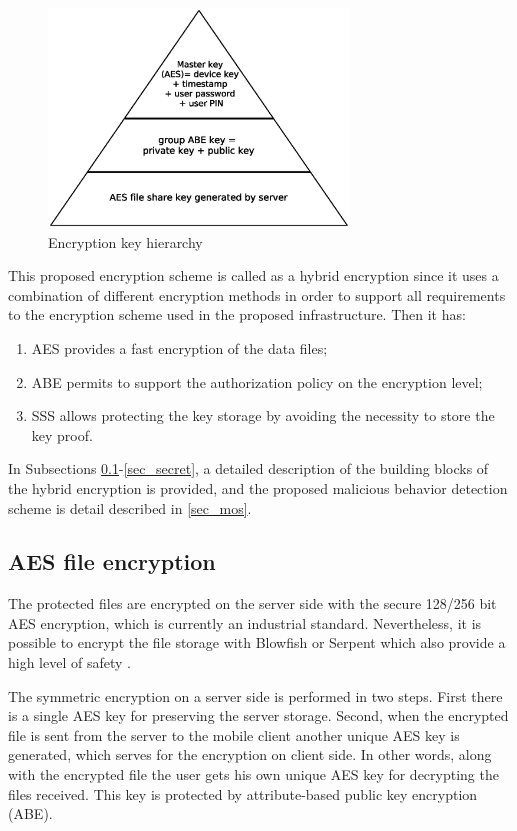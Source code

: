 \documentclass[twocolumn]{svjour3}          	%
\begin{document}
\begin{figure}[h!]
	\centering
	\includegraphics[width=8cm]{fig08.eps}
	\caption{Encryption key hierarchy}
	\label{fig:08}
\end{figure}

This proposed encryption scheme is called as a hybrid encryption since it uses a combination of different encryption methods in order to support all requirements to the encryption scheme used in the proposed infrastructure. Then it has:

\begin{enumerate}
	\item AES provides a fast encryption of the data files;
	\item ABE permits to support the authorization policy on the encryption level;
	\item SSS allows protecting the key storage by avoiding the necessity to store the key proof.
\end{enumerate}

In Subsections \ref{sec_aes}-\ref{sec_secret}, a detailed description of the building blocks of the hybrid encryption is provided, and the proposed malicious behavior detection scheme is detail described in \ref{sec_mos}.

\subsection{AES file encryption }
\label{sec_aes}
The protected files are encrypted on the server side with the secure 128/256 bit AES encryption, which is currently an industrial standard. Nevertheless, it is possible to encrypt the file storage with Blowfish or Serpent which also provide a high level of safety \cite{nist2000}. 

The symmetric encryption on a server side is performed in two steps. First there is a single AES key for preserving the server storage. Second, when the encrypted file is sent from the server to the mobile client another unique AES key is generated, which serves for the encryption on client side. In other words, along with the encrypted file the user gets his own unique AES key for decrypting the files received. This key is protected by attribute-based public key encryption (ABE). 
\end{document}
